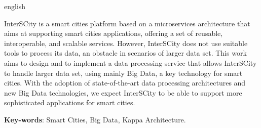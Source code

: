 \begin{resumo}[Abstract]
 \begin{otherlanguage*}{english}

     InterSCity is a smart cities platform based on a microservices
     architecture that aims at supporting smart cities applications, offering a
     set of reusable, interoperable, and scalable services. However, InterSCity
     does not use suitable tools to process its data, an obstacle in scenarios
     of larger data set. This work aims to design and to implement a data
     processing service that allows InterSCity to handle larger data set, using
     mainly Big Data, a key technology for smart cities. With the adoption of
     state-of-the-art data processing architectures and new Big Data
     technologies, we expect InterSCity to be able to support more
     sophisticated applications for smart cities.

   \vspace{\onelineskip}
 
   \noindent 
   \textbf{Key-words}: Smart Cities, Big Data, Kappa Architecture.
 \end{otherlanguage*}
\end{resumo}

